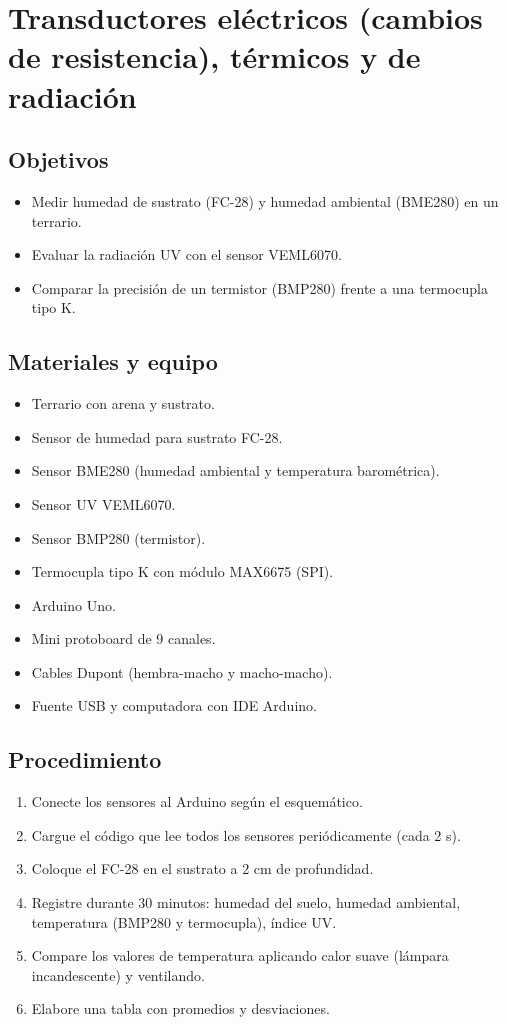 \chapter{Transductores eléctricos (cambios de resistencia), térmicos y de radiación}

\section*{Objetivos}
\begin{itemize}
    \item Medir humedad de sustrato (FC-28) y humedad ambiental (BME280) en un terrario.
    \item Evaluar la radiación UV con el sensor VEML6070.
    \item Comparar la precisión de un termistor (BMP280) frente a una termocupla tipo K.
\end{itemize}

\section*{Materiales y equipo}
\begin{itemize}
    \item Terrario con arena y sustrato.
    \item Sensor de humedad para sustrato FC-28.
    \item Sensor BME280 (humedad ambiental y temperatura barométrica).
    \item Sensor UV VEML6070.
    \item Sensor BMP280 (termistor).
    \item Termocupla tipo K con módulo MAX6675 (SPI).
    \item Arduino Uno.
    \item Mini protoboard de 9 canales.
    \item Cables Dupont (hembra-macho y macho-macho).
    \item Fuente USB y computadora con IDE Arduino.
\end{itemize}

\section*{Procedimiento}
\begin{enumerate}
    \item Conecte los sensores al Arduino según el esquemático.
    \item Cargue el código que lee todos los sensores periódicamente (cada 2 s).
    \item Coloque el FC-28 en el sustrato a 2 cm de profundidad.
    \item Registre durante 30 minutos: humedad del suelo, humedad ambiental, temperatura (BMP280 y termocupla), índice UV.
    \item Compare los valores de temperatura aplicando calor suave (lámpara incandescente) y ventilando.
    \item Elabore una tabla con promedios y desviaciones.
\end{enumerate}

